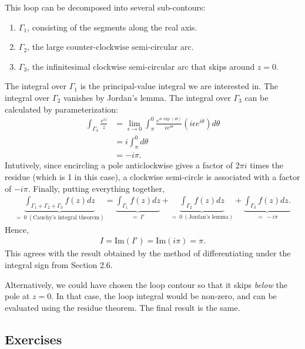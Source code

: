 \documentclass[10pt,a4paper]{article}
\begin{document}
\noindent
This loop can be decomposed into several sub-contours:
\begin{enumerate}
\item  $\Gamma_1$, consisting of the segments along the real axis.
\item $\Gamma_2$, the large counter-clockwise semi-circular arc.
\item $\Gamma_3$, the infinitesimal clockwise semi-circular arc that skips around $z = 0$.
\end{enumerate}

\noindent
The integral over $\Gamma_1$ is the principal-value integral we are
interested in.  The integral over $\Gamma_2$ vanishes by Jordan's
lemma. The integral over $\Gamma_3$ can be calculated by
parameterization:
\begin{align}
  \int_{\Gamma_3} \frac{e^{iz}}{z} &= \lim_{\epsilon \rightarrow 0} \int_{\pi}^{0} \frac{e^{i\epsilon \exp(i\theta)}}{\epsilon e^{i\theta}} \left(i\epsilon e^{i\theta}\right) d\theta \\
  &= i \int_{\pi}^0 d\theta \\
  &= - i\pi.
\end{align}
Intutively, since encircling a pole anticlockwise gives a factor of
$2\pi i$ times the residue (which is 1 in this case), a clockwise
semi-circle is associated with a factor of $- i \pi$. Finally, putting
everything together,
\begin{align}
  \underbrace{\int_{\Gamma_1 + \Gamma_2 + \Gamma_3} f(z) dz}_{ =~0~(\text{Cauchy's integral theorem})} = \underbrace{\int_{\Gamma_1} f(z) dz}_{=~I'} + \underbrace{\int_{\Gamma_2} f(z) dz}_{=~0~(\text{Jordan's lemma})} + \underbrace{\int_{\Gamma_3} f(z) dz.}_{=~-i \pi}
\end{align}
Hence,
\begin{align}
  I = \mathrm{Im}(I') = \mathrm{Im}(i\pi) = \pi.
\end{align}
This agrees with the result obtained by the method of differentiating
under the integral sign from Section 2.6.

Alternatively, we could have chosen the loop contour so that it skips
\textit{below} the pole at $z = 0$.  In that case, the loop integral
would be non-zero, and can be evaluated using the residue theorem.
The final result is the same.

\subsection{Exercises}
\label{exercises}
\end{document}
